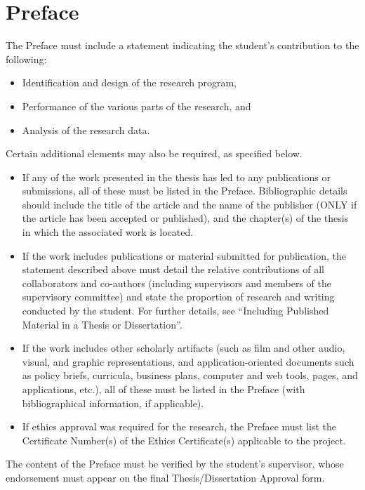 \chapter{Preface}

The Preface must include a statement indicating the student's contribution to the following:

\begin{itemize}
  \item Identification and design of the research program,
  \item Performance of the various parts of the research, and
  \item Analysis of the research data.
\end{itemize}

Certain additional elements may also be required, as specified below.

\begin{itemize}
  \item If any of the work presented in the thesis has led to any publications or submissions, all of these must be listed in the Preface. Bibliographic details should include the title of the article and the name of the publisher (ONLY if the article has been accepted or published), and the chapter(s) of the thesis in which the associated work is located.
  \item If the work includes publications or material submitted for publication, the statement described above must detail the relative contributions of all collaborators and co-authors (including supervisors and members of the supervisory committee) and state the proportion of research and writing conducted by the student. For further details, see “Including Published Material in a Thesis or Dissertation”.
  \item If the work includes other scholarly artifacts (such as film and other audio, visual, and graphic representations, and application-oriented documents such as policy briefs, curricula, business plans, computer and web tools, pages, and applications, etc.), all of these must be listed in the Preface (with bibliographical information, if applicable).
  \item If ethics approval was required for the research, the Preface must list the Certificate Number(s) of the Ethics Certificate(s) applicable to the project.
\end{itemize}

The content of the Preface must be verified by the student's supervisor, whose endorsement must appear on the final Thesis/Dissertation Approval form.